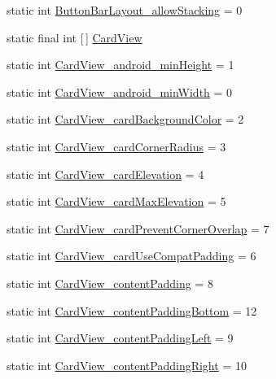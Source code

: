 \begin{DoxyCompactItemize}
\item 
static int \hyperlink{classandroid_1_1support_1_1v4_1_1R_1_1styleable_a6b2ecbc44c0c2e73eb30c15bb8834cb4}{Button\+Bar\+Layout\+\_\+allow\+Stacking} = 0
\item 
static final int \mbox{[}$\,$\mbox{]} \hyperlink{classandroid_1_1support_1_1v4_1_1R_1_1styleable_a0e520cd4c78beb0d456e4018c4ba0e86}{Card\+View}
\item 
static int \hyperlink{classandroid_1_1support_1_1v4_1_1R_1_1styleable_aaaed164abf7a1a6053c6351516843220}{Card\+View\+\_\+android\+\_\+min\+Height} = 1
\item 
static int \hyperlink{classandroid_1_1support_1_1v4_1_1R_1_1styleable_a4c667d1c23f054057861f222b3725f20}{Card\+View\+\_\+android\+\_\+min\+Width} = 0
\item 
static int \hyperlink{classandroid_1_1support_1_1v4_1_1R_1_1styleable_add1dcf3149907ef88fe6cae0109b1aed}{Card\+View\+\_\+card\+Background\+Color} = 2
\item 
static int \hyperlink{classandroid_1_1support_1_1v4_1_1R_1_1styleable_afbb158deb29f5a8054222a96fe5359de}{Card\+View\+\_\+card\+Corner\+Radius} = 3
\item 
static int \hyperlink{classandroid_1_1support_1_1v4_1_1R_1_1styleable_a6978e1a529e4bd289788c4b5ae24873c}{Card\+View\+\_\+card\+Elevation} = 4
\item 
static int \hyperlink{classandroid_1_1support_1_1v4_1_1R_1_1styleable_a1f0c57b668e80289ddb732e9a4fe86a7}{Card\+View\+\_\+card\+Max\+Elevation} = 5
\item 
static int \hyperlink{classandroid_1_1support_1_1v4_1_1R_1_1styleable_adca5c81b9e709af7b9e1770499743d3b}{Card\+View\+\_\+card\+Prevent\+Corner\+Overlap} = 7
\item 
static int \hyperlink{classandroid_1_1support_1_1v4_1_1R_1_1styleable_aa052776cfb54eff97c0459a640052f49}{Card\+View\+\_\+card\+Use\+Compat\+Padding} = 6
\item 
static int \hyperlink{classandroid_1_1support_1_1v4_1_1R_1_1styleable_a564488b553dfbc662144498fdb3ecd3f}{Card\+View\+\_\+content\+Padding} = 8
\item 
static int \hyperlink{classandroid_1_1support_1_1v4_1_1R_1_1styleable_a4c12c78d4549a7b68d829d1821c87404}{Card\+View\+\_\+content\+Padding\+Bottom} = 12
\item 
static int \hyperlink{classandroid_1_1support_1_1v4_1_1R_1_1styleable_a198660da26d93adbeb9a7e86272310cd}{Card\+View\+\_\+content\+Padding\+Left} = 9
\item 
static int \hyperlink{classandroid_1_1support_1_1v4_1_1R_1_1styleable_ae19bc670fb53e513aa81d12cbd997100}{Card\+View\+\_\+content\+Padding\+Right} = 10

\end{DoxyCompactItemize}
